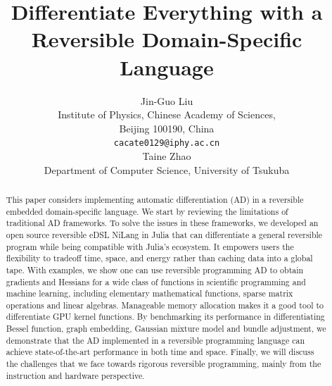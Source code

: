 \documentclass{article}
\newcommand{\<}{\langle}
\renewcommand{\>}{\rangle}
\theoremstyle{definition}\newtheorem{definition}{\textit{Definition}}
\begin{document}
\title{Differentiate Everything with a Reversible Domain-Specific Language}

\author{Jin-Guo Liu\\
Institute of Physics, Chinese Academy of Sciences,\\Beijing 100190, China\\
\texttt{cacate0129@iphy.ac.cn}\\
\And
Taine Zhao\\
Department of Computer Science, University of Tsukuba\\
}



\maketitle

\begin{abstract}
    This paper considers implementing automatic differentiation (AD) in a reversible embedded domain-specific language. We start by reviewing the limitations of traditional AD frameworks. To solve the issues in these frameworks, we developed an open source reversible eDSL NiLang in Julia that can differentiate a general reversible program while being compatible with Julia's ecosystem. It empowers users the flexibility to tradeoff time, space, and energy rather than caching data into a global tape. With examples, we show one can use reversible programming AD to obtain gradients and Hessians for a wide class of functions in scientific programming and machine learning, including elementary mathematical functions, sparse matrix operations and linear algebras. Manageable memory allocation makes it a good tool to differentiate GPU kernel functions.
By benchmarking its performance in differentiating Bessel function, graph embedding, Gaussian mixture model and bundle adjustment, we demonstrate that the AD implemented in a reversible programming language can achieve state-of-the-art performance in both time and space. Finally, we will discuss the challenges that we face towards rigorous reversible programming, mainly from the instruction and hardware perspective.
\end{abstract}
\end{document}
